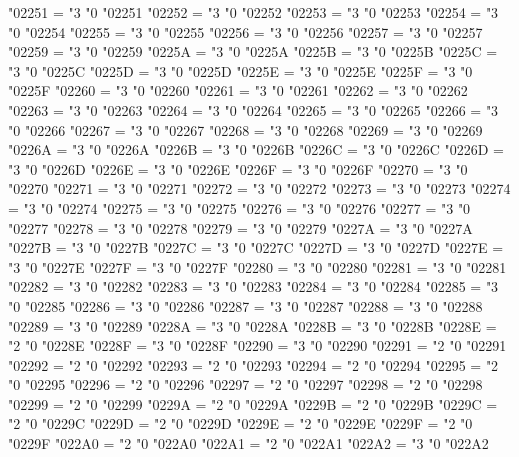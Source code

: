 \Umathcode "02251 = "3 "0 "02251
\Umathcode "02252 = "3 "0 "02252
\Umathcode "02253 = "3 "0 "02253
\Umathcode "02254 = "3 "0 "02254
\Umathcode "02255 = "3 "0 "02255
\Umathcode "02256 = "3 "0 "02256
\Umathcode "02257 = "3 "0 "02257
\Umathcode "02259 = "3 "0 "02259
\Umathcode "0225A = "3 "0 "0225A
\Umathcode "0225B = "3 "0 "0225B
\Umathcode "0225C = "3 "0 "0225C
\Umathcode "0225D = "3 "0 "0225D
\Umathcode "0225E = "3 "0 "0225E
\Umathcode "0225F = "3 "0 "0225F
\Umathcode "02260 = "3 "0 "02260
\Umathcode "02261 = "3 "0 "02261
\Umathcode "02262 = "3 "0 "02262
\Umathcode "02263 = "3 "0 "02263
\Umathcode "02264 = "3 "0 "02264
\Umathcode "02265 = "3 "0 "02265
\Umathcode "02266 = "3 "0 "02266
\Umathcode "02267 = "3 "0 "02267
\Umathcode "02268 = "3 "0 "02268
\Umathcode "02269 = "3 "0 "02269
\Umathcode "0226A = "3 "0 "0226A
\Umathcode "0226B = "3 "0 "0226B
\Umathcode "0226C = "3 "0 "0226C
\Umathcode "0226D = "3 "0 "0226D
\Umathcode "0226E = "3 "0 "0226E
\Umathcode "0226F = "3 "0 "0226F
\Umathcode "02270 = "3 "0 "02270
\Umathcode "02271 = "3 "0 "02271
\Umathcode "02272 = "3 "0 "02272
\Umathcode "02273 = "3 "0 "02273
\Umathcode "02274 = "3 "0 "02274
\Umathcode "02275 = "3 "0 "02275
\Umathcode "02276 = "3 "0 "02276
\Umathcode "02277 = "3 "0 "02277
\Umathcode "02278 = "3 "0 "02278
\Umathcode "02279 = "3 "0 "02279
\Umathcode "0227A = "3 "0 "0227A
\Umathcode "0227B = "3 "0 "0227B
\Umathcode "0227C = "3 "0 "0227C
\Umathcode "0227D = "3 "0 "0227D
\Umathcode "0227E = "3 "0 "0227E
\Umathcode "0227F = "3 "0 "0227F
\Umathcode "02280 = "3 "0 "02280
\Umathcode "02281 = "3 "0 "02281
\Umathcode "02282 = "3 "0 "02282
\Umathcode "02283 = "3 "0 "02283
\Umathcode "02284 = "3 "0 "02284
\Umathcode "02285 = "3 "0 "02285
\Umathcode "02286 = "3 "0 "02286
\Umathcode "02287 = "3 "0 "02287
\Umathcode "02288 = "3 "0 "02288
\Umathcode "02289 = "3 "0 "02289
\Umathcode "0228A = "3 "0 "0228A
\Umathcode "0228B = "3 "0 "0228B
\Umathcode "0228E = "2 "0 "0228E
\Umathcode "0228F = "3 "0 "0228F
\Umathcode "02290 = "3 "0 "02290
\Umathcode "02291 = "2 "0 "02291
\Umathcode "02292 = "2 "0 "02292
\Umathcode "02293 = "2 "0 "02293
\Umathcode "02294 = "2 "0 "02294
\Umathcode "02295 = "2 "0 "02295
\Umathcode "02296 = "2 "0 "02296
\Umathcode "02297 = "2 "0 "02297
\Umathcode "02298 = "2 "0 "02298
\Umathcode "02299 = "2 "0 "02299
\Umathcode "0229A = "2 "0 "0229A
\Umathcode "0229B = "2 "0 "0229B
\Umathcode "0229C = "2 "0 "0229C
\Umathcode "0229D = "2 "0 "0229D
\Umathcode "0229E = "2 "0 "0229E
\Umathcode "0229F = "2 "0 "0229F
\Umathcode "022A0 = "2 "0 "022A0
\Umathcode "022A1 = "2 "0 "022A1
\Umathcode "022A2 = "3 "0 "022A2
